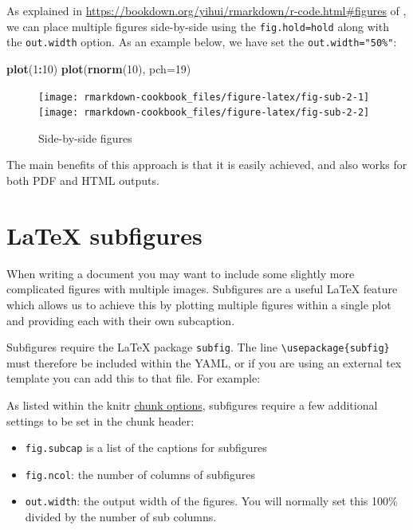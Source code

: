 \documentclass[]{book}
\newenvironment{Shaded}{\begin{snugshade}}{\end{snugshade}}
\newcommand{\DataTypeTok}[1]{\textcolor[rgb]{0.13,0.29,0.53}{#1}}
\newcommand{\DecValTok}[1]{\textcolor[rgb]{0.00,0.00,0.81}{#1}}
\newcommand{\KeywordTok}[1]{\textcolor[rgb]{0.13,0.29,0.53}{\textbf{#1}}}
\newcommand{\NormalTok}[1]{#1}
\newcommand{\OperatorTok}[1]{\textcolor[rgb]{0.81,0.36,0.00}{\textbf{#1}}}
\providecommand{\tightlist}{%
  \setlength{\itemsep}{0pt}\setlength{\parskip}{0pt}}
\theoremstyle{definition}
\theoremstyle{definition}
\theoremstyle{definition}
\theoremstyle{remark}
\begin{document}
As explained in
\url{https://bookdown.org/yihui/rmarkdown/r-code.html\#figures} of
\citet{xie2018}, we can place multiple figures side-by-side using the
\texttt{fig.hold=\textquotesingle{}hold\textquotesingle{}} along with
the \texttt{out.width} option. As an example below, we have set the
\texttt{out.width="50\%"}:

\begin{Shaded}
\begin{Highlighting}[]
\KeywordTok{plot}\NormalTok{(}\DecValTok{1}\OperatorTok{:}\DecValTok{10}\NormalTok{)}
\KeywordTok{plot}\NormalTok{(}\KeywordTok{rnorm}\NormalTok{(}\DecValTok{10}\NormalTok{), }\DataTypeTok{pch=}\DecValTok{19}\NormalTok{)}
\end{Highlighting}
\end{Shaded}

\begin{figure}
\texttt{[image: rmarkdown-cookbook\_files/figure-latex/fig-sub-2-1]} \texttt{[image: rmarkdown-cookbook\_files/figure-latex/fig-sub-2-2]} \caption{Side-by-side figures}\label{fig:fig-sub-2}
\end{figure}

The main benefits of this approach is that it is easily achieved, and
also works for both PDF and HTML outputs.

\hypertarget{latex-subfigures}{%
\section{LaTeX subfigures}\label{latex-subfigures}}

When writing a document you may want to include some slightly more
complicated figures with multiple images. Subfigures are a useful LaTeX
feature which allows us to achieve this by plotting multiple figures
within a single plot and providing each with their own subcaption.

Subfigures require the LaTeX package \texttt{subfig}. The line
\texttt{\textbackslash{}usepackage\{subfig\}} must therefore be included
within the YAML, or if you are using an external tex template you can
add this to that file. For example:

As listed within the knitr
\href{https://yihui.name/knitr/options/}{chunk options}, subfigures
require a few additional settings to be set in the chunk header:

\begin{itemize}
\tightlist
\item
  \texttt{fig.subcap} is a list of the captions for subfigures
\item
  \texttt{fig.ncol}: the number of columns of subfigures
\item
  \texttt{out.width}: the output width of the figures. You will normally
  set this 100\% divided by the number of sub columns.
\end{itemize}
\end{document}
